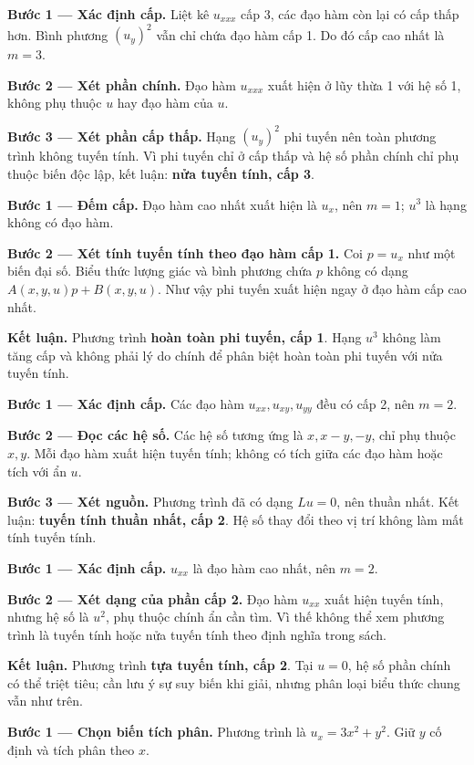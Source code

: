 \textbf{Bước 1 — Xác định cấp.} Liệt kê $u_{xxx}$ cấp 3, các đạo hàm còn lại có cấp thấp hơn. Bình phương $(u_y)^2$ vẫn chỉ chứa đạo hàm cấp 1. Do đó cấp cao nhất là $m=3$.

\textbf{Bước 2 — Xét phần chính.} Đạo hàm $u_{xxx}$ xuất hiện ở lũy thừa 1 với hệ số 1, không phụ thuộc $u$ hay đạo hàm của $u$.

\textbf{Bước 3 — Xét phần cấp thấp.} Hạng $(u_y)^2$ phi tuyến nên toàn phương trình không tuyến tính. Vì phi tuyến chỉ ở cấp thấp và hệ số phần chính chỉ phụ thuộc biến độc lập, kết luận: \textbf{nửa tuyến tính, cấp 3}.

\textbf{Bước 1 — Đếm cấp.} Đạo hàm cao nhất xuất hiện là $u_x$, nên $m=1$; $u^3$ là hạng không có đạo hàm.

\textbf{Bước 2 — Xét tính tuyến tính theo đạo hàm cấp 1.} Coi $p=u_x$ như một biến đại số. Biểu thức lượng giác và bình phương chứa $p$ không có dạng $A(x,y,u)p+B(x,y,u)$. Như vậy phi tuyến xuất hiện ngay ở đạo hàm cấp cao nhất.

\textbf{Kết luận.} Phương trình \textbf{hoàn toàn phi tuyến, cấp 1}. Hạng $u^3$ không làm tăng cấp và không phải lý do chính để phân biệt hoàn toàn phi tuyến với nửa tuyến tính.

\textbf{Bước 1 — Xác định cấp.} Các đạo hàm $u_{xx},u_{xy},u_{yy}$ đều có cấp 2, nên $m=2$.

\textbf{Bước 2 — Đọc các hệ số.} Các hệ số tương ứng là $x,x-y,-y$, chỉ phụ thuộc $x,y$. Mỗi đạo hàm xuất hiện tuyến tính; không có tích giữa các đạo hàm hoặc tích với ẩn $u$.

\textbf{Bước 3 — Xét nguồn.} Phương trình đã có dạng $Lu=0$, nên thuần nhất. Kết luận: \textbf{tuyến tính thuần nhất, cấp 2}. Hệ số thay đổi theo vị trí không làm mất tính tuyến tính.

\textbf{Bước 1 — Xác định cấp.} $u_{xx}$ là đạo hàm cao nhất, nên $m=2$.

\textbf{Bước 2 — Xét dạng của phần cấp 2.} Đạo hàm $u_{xx}$ xuất hiện tuyến tính, nhưng hệ số là $u^2$, phụ thuộc chính ẩn cần tìm. Vì thế không thể xem phương trình là tuyến tính hoặc nửa tuyến tính theo định nghĩa trong sách.

\textbf{Kết luận.} Phương trình \textbf{tựa tuyến tính, cấp 2}. Tại $u=0$, hệ số phần chính có thể triệt tiêu; cần lưu ý sự suy biến khi giải, nhưng phân loại biểu thức chung vẫn như trên.

\textbf{Bước 1 — Chọn biến tích phân.} Phương trình là $u_x=3x^2+y^2$. Giữ $y$ cố định và tích phân theo $x$.

